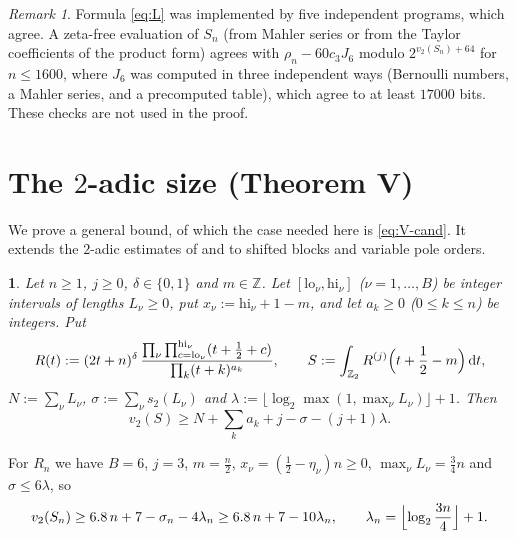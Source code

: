 \documentclass{amsart}
\newcommand{\thisthmname}{}
\newtheorem*{genericthm}{\thisthmname}
\newenvironment{namedthm}[1]{\renewcommand{\thisthmname}{#1}\begin{genericthm}}{\end{genericthm}}
\theoremstyle{definition}
\theoremstyle{remark}
\newtheorem{remark}[theorem]{Remark}
\numberwithin{equation}{section}
\newcommand{\Z}{\mathbb{Z}}
\newcommand{\dd}{\,\mathrm{d}}
\begin{document}
\begin{remark}\label{rem:L-checks}
Formula \eqref{eq:L} was implemented by five independent programs, which
agree. A zeta-free evaluation of $S_n$ (from Mahler series or from the Taylor
coefficients of the product form) agrees with $\rho_n-60c_3J_6$ modulo
$2^{v_2(S_n)+64}$ for $n\le1600$, where $J_6$ was computed in three
independent ways (Bernoulli numbers, a Mahler series, and a precomputed
table), which agree to at least $17000$ bits. These checks are not used in
the proof.
\end{remark}

\section{The \texorpdfstring{$2$}{2}-adic size (Theorem V)}\label{sec:V}

We prove a general bound, of which the case needed here is \eqref{eq:V-cand}.
It extends the $2$-adic estimates of \cite[\S4]{Lai25} and \cite{LSZ26} to
shifted blocks and variable pole orders.

\begin{namedthm}{Theorem V}
Let $n\ge1$, $j\ge0$, $\delta\in\{0,1\}$ and $m\in\Z$. Let
$[\mathrm{lo}_\nu,\mathrm{hi}_\nu]$ ($\nu=1,\dots,B$) be integer intervals of
lengths $L_\nu\ge0$, put $x_\nu:=\mathrm{hi}_\nu+1-m$, and let
$a_k\ge0$ ($0\le k\le n$) be integers. Put
\[
  R(t):=(2t+n)^\delta\,\frac{\prod_\nu\prod_{c=\mathrm{lo}_\nu}^{\mathrm{hi}_\nu}(t+\frac12+c)}{\prod_k(t+k)^{a_k}},
  \qquad S:=\int_{\Z_2}R^{(j)}\Bigl(t+\frac12-m\Bigr)\dd t,
\]
$N:=\sum_\nu L_\nu$, $\sigma:=\sum_\nu s_2(L_\nu)$ and
$\lambda:=\lfloor\log_2\max(1,\max_\nu L_\nu)\rfloor+1$. Then
\[
  v_2(S)\ge N+\sum_ka_k+j-\sigma-(j+1)\lambda .
\]
\end{namedthm}

For $R_n$ we have $B=6$, $j=3$, $m=\frac n2$, $x_\nu=(\frac12-\eta_\nu)n\ge0$,
$\max_\nu L_\nu=\frac34n$ and $\sigma\le6\lambda$, so
\begin{equation}\label{eq:V-cand}
  v_2(S_n)\ge6.8\,n+7-\sigma_n-4\lambda_n\ge6.8\,n+7-10\lambda_n,\qquad
  \lambda_n=\Bigl\lfloor\log_2\frac{3n}4\Bigr\rfloor+1 .
\end{equation}
\end{document}
